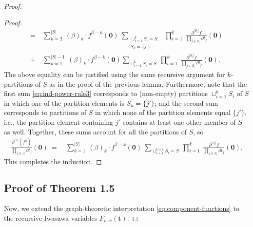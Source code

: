 \documentclass[12pt, reqno, oneside]{amsart}
\numberwithin{equation}{section}
\begin{document}
\begin{proof}
\begin{proof}
\begin{align}
\label{eq:ind-power-rule3}
= \ & 
\sum_{k=2}^{|S|} \ (\beta)_k \cdot f^{\beta-k}(\mathbf{0}) \ \sum_{\substack{\sqcup_{i=1}^{k} S_i = S, \\ S_{k}=\{j'\}}} \ \prod_{i=1}^{k} \ \frac{\partial^{|S_i|}f}{\prod_{j\in S_i}\partial t_j}(\mathbf{0}) \\
\label{eq:ind-power-rule4}
+ \ & \sum_{k=1}^{|S|-1} \ (\beta)_k \cdot f^{\beta-k}(\mathbf{0})\sum_{\sqcup_{i=1}^k S_i = S} \ \prod_{i=1}^k \ \frac{\partial^{|S_{i}|}f}{\prod_{j\in S_{i}}\partial t_j}(\mathbf{0}).
\end{align}
The above equality can be justified using the same recursive argument for $k$-partitions of $S$ as in the proof of the previous lemma. Furthermore, note that the first sum \eqref{eq:ind-power-rule3} corresponds to (non-empty) partitions $\sqcup_{i=1}^k S_i$ of $S$ in which one of the partition elements is $S_k=\{j'\}$; and the second sum corresponds to partitions of $S$ in which none of the partition elements equal $\{j'\}$, i.e., the partition element containing $j'$ contains at least one other member of $S$ as well. Together, these sums account for all the partitions of $S$, so
\begin{align}
\frac{\partial^{|S|} (f^\beta)}{\prod_{j \in A}\partial t_j}(\mathbf{0}) \ = \ & \sum_{k=1}^{|S|} \ (\beta)_{k} \cdot f^{\beta-k}(\mathbf{0}) \ \sum_{\sqcup_{i=1}^{k+1} S_i = S} \ \prod_{i=1}^{k} \ \frac{\partial^{|S_i|}f}{\prod_{j\in S_i}\partial t_j}(\mathbf{0}).
\end{align}  
This completes the induction. 
\end{proof}

%
%

\subsection{Proof of Theorem 1.5}\label{subsec:main-thm}
Now, we extend the graph-theoretic interpretation \eqref{eq:component-functions} to the recursive Iwasawa variables $F_{v,w}(\mathbf{t})$.  


\end{proof}
\end{document}
